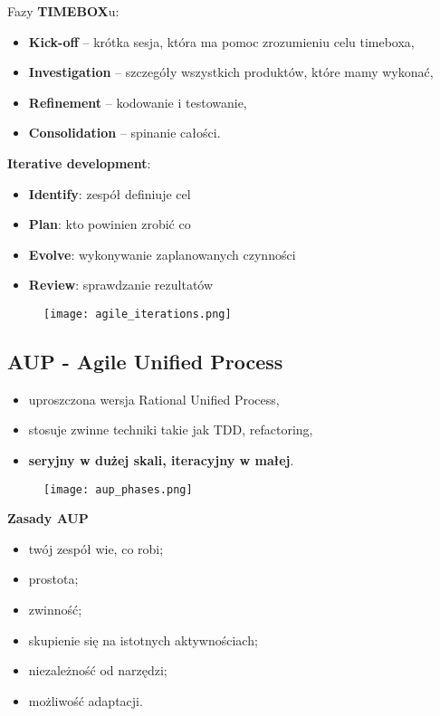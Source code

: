 \documentclass[a4paper]{article}
\begin{document}
    Fazy \textbf{TIMEBOX}u:
    \begin{itemize}
        \item \textbf{Kick-off} – krótka sesja, która ma pomoc zrozumieniu celu timeboxa,
        \item \textbf{Investigation} – szczegóły wszystkich produktów, które mamy wykonać,
        \item \textbf{Refinement} – kodowanie i testowanie,
        \item \textbf{Consolidation} – spinanie całości.
    \end{itemize}

    \textbf{Iterative development}:
    \begin{itemize}
        \item \textbf{Identify}: zespół definiuje cel
        \item \textbf{Plan}: kto powinien zrobić co
        \item \textbf{Evolve}: wykonywanie
        zaplanowanych czynności
        \item \textbf{Review}: sprawdzanie rezultatów
    \end{itemize}


    \begin{figure}[H]
        \texttt{[image: agile\_iterations.png]}
    \end{figure}


    \subsection{AUP - Agile Unified Process}

    \begin{itemize}
        \item uproszczona wersja Rational Unified Process,
        \item stosuje zwinne techniki takie jak TDD, refactoring,
        \item \textbf{seryjny w dużej skali, iteracyjny w małej}.
    \end{itemize}


    \begin{figure}[H]
        \texttt{[image: aup\_phases.png]}
    \end{figure}


    \textbf{Zasady AUP}
    \begin{itemize}
        \item twój zespół wie, co robi;
        \item prostota;
        \item zwinność;
        \item skupienie się na istotnych aktywnościach;
        \item niezależność od narzędzi;
        \item możliwość adaptacji.
    \end{itemize}
\end{document}
